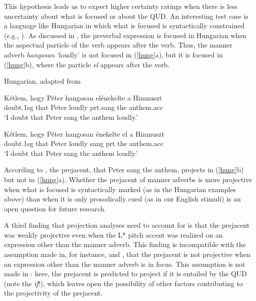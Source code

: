 \documentclass[a4paper,12pt]{article}
\newcommand{\6}{\mbox{$[\hspace*{-.6mm}[$}}
\newcommand{\9}{\mbox{$]\hspace*{-.6mm}]$}}
\begin{document}
This hypothesis leads us to expect higher certainty ratings when there is less uncertainty about what is focused or about the QUD. An interesting test case is a language like Hungarian in which what is focused is syntactically constrained (e.g., \citealt{szabolcsi81,kiss87}). As discussed in \citealt{abrusan2013}, the preverbal expression is focused in Hungarian when the aspectual particle of the verb appears after the verb. Thus, the manner adverb {\em hangosan} `loudly' is not focused  in (\ref{hung}a), but it is focused in (\ref{hung}b), where the particle {\em el} appears after the verb. 

\begin{exe}
\ex\label{hung} Hungarian, adapted from \citealt[260]{abrusan2013}
\begin{xlist}

\ex \gll K\'etlem, hogy P\'eter hangosan el\'enekelte a Himnuszt \\ doubt.1sg that Peter loudly prt.sang the anthem.acc \\ \glt `I doubt that Peter sang the anthem loudly.' 

\ex \gll K\'etlem, hogy P\'eter hangosan \'enekelte el a Himnuszt \\ doubt.1sg that Peter loudly sang prt the anthem.acc \\ \glt `I doubt that Peter sang the anthem loudly.'  

\end{xlist}
\end{exe}
According to \citet[260]{abrusan2013}, the prejacent, that Peter sang the anthem, projects in (\ref{hung}b) but not in (\ref{hung}a). Whether the prejacent of manner adverbs is more projective when what is focused is syntactically marked (as in the Hungarian examples above) than when it is only prosodically cued (as in our English stimuli) is an open question for future research. 

A third finding that projection analyses need to account for is that the prejacent was weakly projective even when the L* pitch accent  was realized on an expression other than the manner adverb. This finding is incompatible with the assumption made in, for instance, \citealt{simons01} and \citealt{abrusan2013}, that the prejacent is not projective when an expression other than the manner adverb is in focus. This assumption is not made in \citealt{stevens-etal2017}: here, the prejacent is predicted to project if it is entailed by the QUD (note the {\em if}!), which leaves open the possibility of other factors contributing to the projectivity of the prejacent. 
\end{document}
